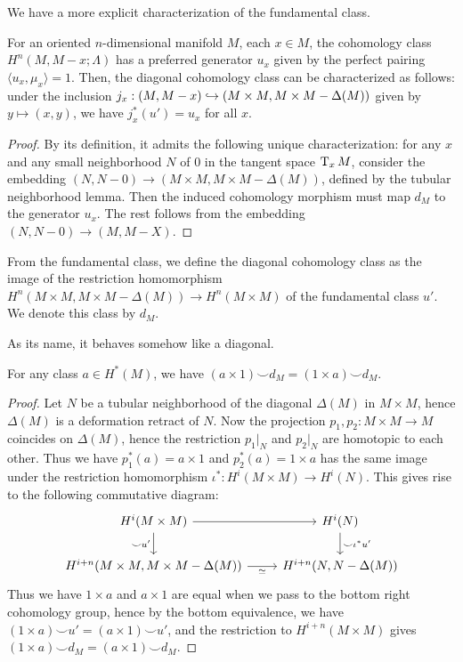 	We have a more explicit characterization of the fundamental class. 
	\begin{prop}\label{Fund_char}
		For an oriented $n$-dimensional manifold $M$, each $x\in M$, the cohomology class $H^n(M,M-x;\Lambda)$ has a preferred generator $u_x$ given by the perfect pairing $\langle u_x,\mu_x\rangle=1$. Then, the diagonal cohomology class can be characterized as follows: under the inclusion $j_x:(M,M-x)\hookrightarrow(M\times M,M\times M-\Delta(M))$ given by $y\mapsto(x,y)$, we have $j_x^*(u')=u_x$ for all $x$. 
	\end{prop}
	\begin{proof}
		By its definition, it admits the following unique characterization: for any $x$ and any small neighborhood $N$ of $0$ in the tangent space $\operatorname{\mathrm{T}}_xM$, consider the embedding $(N,N-0)\to(M\times M,M\times M-\Delta(M))$, defined by the tubular neighborhood lemma. Then the induced cohomology morphism must map $d_M$ to the generator $u_x$. The rest follows from the embedding $(N,N-0)\to(M,M-X)$. 
	\end{proof}
	
	\begin{defn}
		From the fundamental class, we define the diagonal cohomology class as the image of the restriction homomorphism $H^n(M\times M,M\times M-\Delta(M))\to H^n(M\times M)$ of the fundamental class $u'$. We denote this class by $d_M$. 
	\end{defn}
	
	As its name, it behaves somehow like a diagonal. 
	\begin{lemma}
		For any class $a\in H^*(M)$, we have $(a\times 1)\smile d_M=(1\times a)\smile d_M$. 
	\end{lemma}
	\begin{proof}
		Let $N$ be a tubular neighborhood of the diagonal $\Delta(M)$ in $M\times M$, hence $\Delta(M)$ is a deformation retract of $N$. Now the projection $p_1,p_2:M\times M\to M$ coincides on $\Delta(M)$, hence the restriction $p_1|_N$ and $p_2|_N$ are homotopic to each other. Thus we have $p_1^*(a)=a\times 1$ and $p_2^*(a)=1\times a$ has the same image under the restriction homomorphism $\iota^*:H^i(M\times M)\to H^i(N)$. This gives rise to the following commutative diagram: 
		\[\begin{tikzcd}
			{H^i(M\times M)} & {H^i(N)} \\
			{H^{i+n}(M\times M,M\times M-\Delta(M))} & {H^{i+n}(N,N-\Delta(M))}
			\arrow[from=1-1, to=1-2]
			\arrow["{\smile \iota^*u'}", from=1-2, to=2-2]
			\arrow["{\smile u'}"', from=1-1, to=2-1]
			\arrow["\simeq"', from=2-1, to=2-2]
		\end{tikzcd}\]
		Thus we have $1\times a$ and $a\times 1$ are equal when we pass to the bottom right cohomology group, hence by the bottom equivalence, we have $(1\times a)\smile u'=(a\times 1)\smile u'$, and the restriction to $H^{i+n}(M\times M)$ gives $(1\times a)\smile d_M=(a\times 1)\smile d_M$. 
	\end{proof}
	
